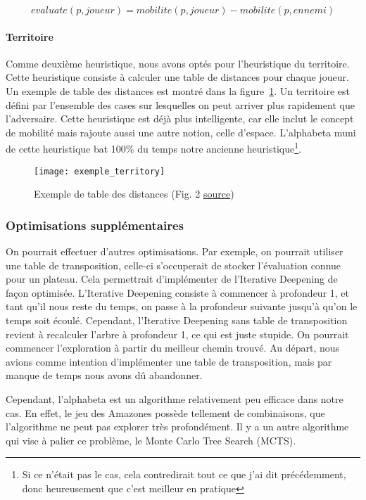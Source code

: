 \begin{equation}
	evaluate(p, joueur) = mobilite(p, joueur) - mobilite(p, ennemi)
	\label{eq:mobility-heuristic}
\end{equation}

\paragraph{Territoire}
Comme deuxième heuristique, nous avons optés pour l'heuristique du territoire.
Cette heuristique consiste à calculer une table de distances pour chaque joueur.
Un exemple de table des distances est montré dans la figure~\ref{fig:exemple-territoire}.
Un territoire est défini par l'ensemble des cases sur lesquelles on peut arriver plus rapidement
que l'adversaire. Cette heuristique est déjà plus intelligente, car elle inclut le concept de mobilité mais
rajoute aussi une autre notion, celle d'espace. L'alphabeta muni de cette heuristique bat
100\% du temps notre ancienne heuristique\footnote{Si ce n'était pas le cas, cela contredirait tout ce que j'ai dit précédemment, donc heureusement que c'est meilleur en pratique}.

\begin{figure}[H]
	\centering
	\texttt{[image: exemple\_territory]}
	\caption{Exemple de table des distances (Fig. 2 \href{https://core.ac.uk/download/pdf/81108035.pdf}{source})}
	\label{fig:exemple-territoire}
\end{figure}
\subsubsection{Optimisations supplémentaires}
On pourrait effectuer d'autres optimisations. Par exemple, on pourrait utiliser
une table de transposition, celle-ci s'occuperait de stocker l'évaluation connue pour un plateau.
Cela permettrait d'implémenter de l'Iterative Deepening de façon optimisée. L'Iterative Deepening consiste
à commencer à profondeur 1, et tant qu'il nous reste du temps, on passe à la profondeur suivante jusqu'à qu'on le temps soit écoulé.
Cependant, l'Iterative Deepening sans table de transposition revient à recalculer l'arbre à profondeur 1, ce qui est juste stupide. On pourrait
commencer l'exploration à partir du meilleur chemin trouvé. Au départ, nous avions comme intention
d'implémenter une table de transposition, mais par manque de temps nous avons dû abandonner.

Cependant, l'alphabeta est un algorithme relativement peu efficace dans notre cas. En effet, le jeu des Amazones
possède tellement de combinaisons, que l'algorithme ne peut pas explorer très profondément.
Il y a un autre algorithme qui vise à palier ce problème, le Monte Carlo Tree Search (MCTS).